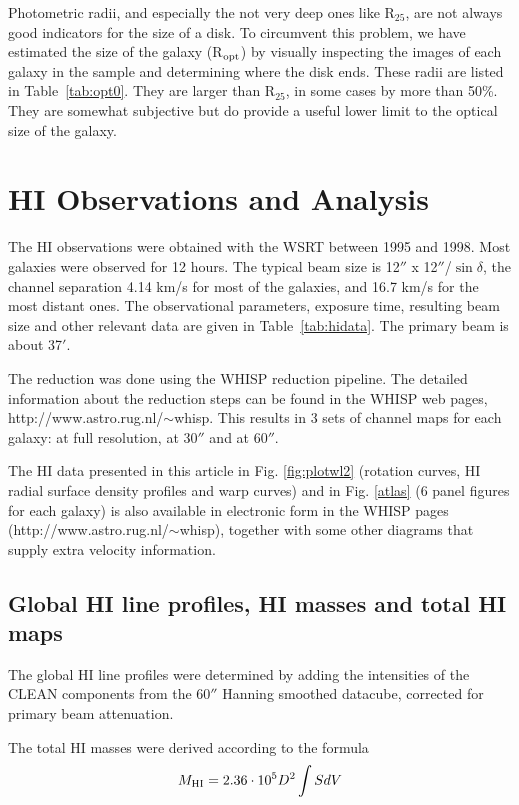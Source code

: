 \documentclass{aa}
\begin{document}
Photometric radii, and especially the not very deep ones like R$_{25}$,
are not always good indicators for the size of a disk. To
circumvent this problem, we have estimated the size of the galaxy
(R$_{\rm opt}$) by visually inspecting the images of each galaxy in the
sample and determining where the disk ends. These radii are listed in
Table~\ref{tab:opt0}. They are larger than R$_{25}$, in some cases by more
than 50\%. They are somewhat subjective but do provide a useful lower
limit to the optical size of the galaxy. 

\section{HI Observations and Analysis}

The HI observations were obtained with the WSRT between 1995 and
1998. Most galaxies were observed for 12 hours. The typical beam size
is 12$''$ x 12$''$/$\sin\delta$, the 
channel separation 4.14 km/s for most of the galaxies, and 16.7 km/s for
the most distant ones. The observational parameters, exposure time,
resulting beam size and other relevant data are given in
Table~\ref{tab:hidata}. The primary beam is about 37$'$.

The reduction was done using the WHISP reduction pipeline. The
detailed information about the reduction steps can be found in the
WHISP web pages, http://www.astro.rug.nl/$\sim$whisp. This results in
3 sets of channel maps for each galaxy: at full resolution,
at 30$''$ and at 60$''$.          

The HI data presented in this article in Fig. \ref{fig:plotwl2}
(rotation curves, HI radial surface density profiles and warp curves)
and in Fig. \ref{atlas} (6 panel figures for each galaxy) is also
available in electronic form in the WHISP pages
(http://www.astro.rug.nl/$\sim$whisp), together with some other
diagrams that supply extra velocity information. 


\subsection{Global HI line profiles, HI masses and total HI maps}

The global HI line profiles were determined by adding the intensities of the
CLEAN components from the 60$''$ Hanning smoothed datacube, corrected for
primary beam attenuation. 

The total HI masses were derived according to the formula
\begin{equation}
M_{\rm{HI}}=2.36\cdot 10^5 D^2 \int{SdV}
\end{equation}
\end{document}
